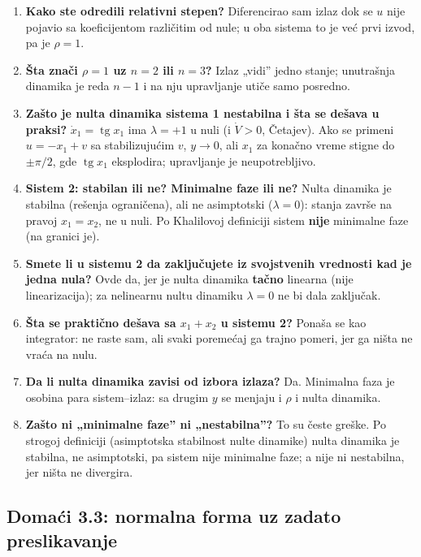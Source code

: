 \documentclass[11pt,a4paper,parskip=half,headsepline,numbers=noenddot]{scrartcl}
\begin{document}
\begin{enumerate}
\def\labelenumi{\arabic{enumi}.}
\item \textbf{Kako ste odredili relativni stepen?} Diferencirao sam izlaz dok se \(u\) nije pojavio sa koeficijentom različitim od nule; u oba sistema to je već prvi izvod, pa je \(\rho = 1\).
\item \textbf{Šta znači \(\rho = 1\) uz \(n = 2\) ili \(n = 3\)?} Izlaz „vidi'' jedno stanje; unutrašnja dinamika je reda \(n - 1\) i na nju upravljanje utiče samo posredno.
\item \textbf{Zašto je nulta dinamika sistema 1 nestabilna i šta se dešava u praksi?} \(\dot x_1 = \operatorname{tg}x_1\) ima \(\lambda = +1\) u nuli (i \(\dot V > 0\), Četajev). Ako se primeni \(u = -x_1 + v\) sa stabilizujućim \(v\), \(y \to 0\), ali \(x_1\) za konačno vreme stigne do \(\pm\pi/2\), gde \(\operatorname{tg}x_1\) eksplodira; upravljanje je neupotrebljivo.
\item \textbf{Sistem 2: stabilan ili ne? Minimalne faze ili ne?} Nulta dinamika je stabilna (rešenja ograničena), ali ne asimptotski (\(\lambda = 0\)): stanja završe na pravoj \(x_1 = x_2\), ne u nuli. Po Khalilovoj definiciji sistem \textbf{nije} minimalne faze (na granici je).
\item \textbf{Smete li u sistemu 2 da zaključujete iz svojstvenih vrednosti kad je jedna nula?} Ovde da, jer je nulta dinamika \textbf{tačno} linearna (nije linearizacija); za nelinearnu nultu dinamiku \(\lambda = 0\) ne bi dala zaključak.
\item \textbf{Šta se praktično dešava sa \(x_1 + x_2\) u sistemu 2?} Ponaša se kao integrator: ne raste sam, ali svaki poremećaj ga trajno pomeri, jer ga ništa ne vraća na nulu.
\item \textbf{Da li nulta dinamika zavisi od izbora izlaza?} Da. Minimalna faza je osobina para sistem--izlaz: sa drugim \(y\) se menjaju i \(\rho\) i nulta dinamika.
\item \textbf{Zašto ni „minimalne faze'' ni „nestabilna''?} To su česte greške. Po strogoj definiciji (asimptotska stabilnost nulte dinamike) nulta dinamika je stabilna, ne asimptotski, pa sistem nije minimalne faze; a nije ni nestabilna, jer ništa ne divergira.
\end{enumerate}

\subsection{Domaći 3.3: normalna forma uz zadato preslikavanje}
\end{document}
